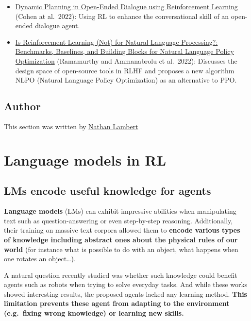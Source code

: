 \documentclass[11pt,a4paper]{article}
\begin{document}
\begin{itemize}
\item
  \href{https://arxiv.org/abs/2208.02294}{Dynamic Planning in Open-Ended Dialogue using Reinforcement Learning} (Cohen at al.~2022): Using RL to enhance the conversational skill of an open-ended dialogue agent.
\item
  \href{https://arxiv.org/abs/2210.01241}{Is Reinforcement Learning (Not) for Natural Language Processing?: Benchmarks, Baselines, and Building Blocks for Natural Language Policy Optimization} (Ramamurthy and Ammanabrolu et al.~2022): Discusses the design space of open-source tools in RLHF and proposes a new algorithm NLPO (Natural Language Policy Optimization) as an alternative to PPO.
\end{itemize}

\subsection{Author}\label{author-4}

This section was written by \href{https://twitter.com/natolambert}{Nathan Lambert}

\section{Language models in RL}\label{language-models-in-rl}

\subsection{LMs encode useful knowledge for agents}\label{lms-encode-useful-knowledge-for-agents}

\textbf{Language models} (LMs) can exhibit impressive abilities when manipulating text such as question-answering or even step-by-step reasoning. Additionally, their training on massive text corpora allowed them to \textbf{encode various types of knowledge including abstract ones about the physical rules of our world} (for instance what is possible to do with an object, what happens when one rotates an object\ldots).

A natural question recently studied was whether such knowledge could benefit agents such as robots when trying to solve everyday tasks. And while these works showed interesting results, the proposed agents lacked any learning method. \textbf{This limitation prevents these agent from adapting to the environment (e.g.~fixing wrong knowledge) or learning new skills.}

\end{document}
